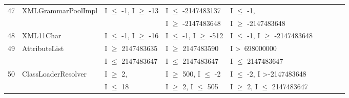 {\begin{longtable}{|l|l|l|l|l|l|l|l|l|}
47	& XMLGrammarPoolImpl		& I $\le$ -1, I $\ge$ -13			& I $\le$ -2147483137 			& I $\le$ -1, 							\\ 
	&							&								& I $\ge$ -2147483648			& I $\ge$ -2147483648				\\
48	& XML11Char				& I $\le$ -1, I $\ge$ -16			& I $\le$ -1, I $\ge$ -512			& I $\le$ -1, I $\ge$ -2147483648	\\ 
49	& AttributeList				& I $\ge$ 2147483635			& I $\ge$ 2147483590			& I \textgreater~698000000					\\ 
	&                                             & I $\le$ 2147483647			& I $\le$ 2147483647			& I $\le$ 2147483647 					\\
50	& ClassLoaderResolver		&  I $\ge$ 2,						& I $\ge$ 500, I $\le$ -2			& I $\le$ -2, I \textgreater -2147483648  	\\ 
	&                                             &  I $\le$ 18						& I $\ge$ 2, I $\le$ 505			& I $\ge$ 2, I $\le$ 2147483647	\\
	\hline
	
\end{longtable}
\label{table:stripDomains}
}









